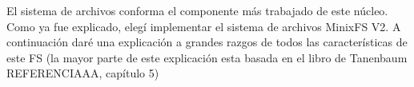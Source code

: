 El sistema de archivos conforma el componente más trabajado de este núcleo. Como
ya fue explicado, elegí implementar el sistema de archivos MinixFS V2. A
continuación daré una explicación a grandes razgos de todos las características
de este FS (la mayor parte de este explicación esta basada en el libro de
Tanenbaum REFERENCIAAA, capítulo 5)
